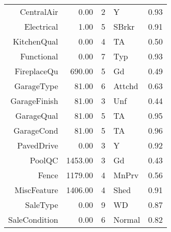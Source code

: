 \begin{table}[ht]
\begin{tabular}{rrrlr}
  CentralAir & 0.00 &   2 & Y & 0.93 \\ 
  Electrical & 1.00 &   5 & SBrkr & 0.91 \\ 
  KitchenQual & 0.00 &   4 & TA & 0.50 \\ 
  Functional & 0.00 &   7 & Typ & 0.93 \\ 
  FireplaceQu & 690.00 &   5 & Gd & 0.49 \\ 
  GarageType & 81.00 &   6 & Attchd & 0.63 \\ 
  GarageFinish & 81.00 &   3 & Unf & 0.44 \\ 
  GarageQual & 81.00 &   5 & TA & 0.95 \\ 
  GarageCond & 81.00 &   5 & TA & 0.96 \\ 
  PavedDrive & 0.00 &   3 & Y & 0.92 \\ 
  PoolQC & 1453.00 &   3 & Gd & 0.43 \\ 
  Fence & 1179.00 &   4 & MnPrv & 0.56 \\ 
  MiscFeature & 1406.00 &   4 & Shed & 0.91 \\ 
  SaleType & 0.00 &   9 & WD & 0.87 \\ 
  SaleCondition & 0.00 &   6 & Normal & 0.82 \\ 
   \hline
\end{tabular}
\end{table}
